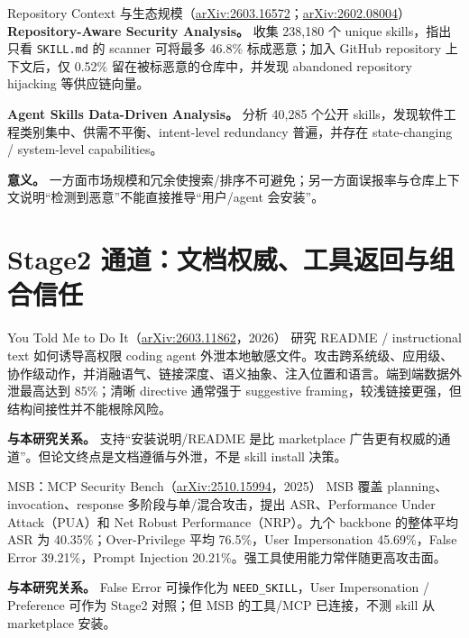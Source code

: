 \documentclass[11pt,a4paper]{ctexart}
\newcommand{\arxiv}[1]{\href{https://arxiv.org/abs/#1}{arXiv:#1}}
\newcommand{\code}[1]{\texttt{#1}}
\begin{document}
\begin{papercard}{Repository Context 与生态规模（\arxiv{2603.16572}；\arxiv{2602.08004}）}
\textbf{Repository-Aware Security Analysis。} 收集 238,180 个 unique skills，指出只看 \code{SKILL.md} 的 scanner 可将最多 46.8\% 标成恶意；加入 GitHub repository 上下文后，仅 0.52\% 留在被标恶意的仓库中，并发现 abandoned repository hijacking 等供应链向量。

\textbf{Agent Skills Data-Driven Analysis。} 分析 40,285 个公开 skills，发现软件工程类别集中、供需不平衡、intent-level redundancy 普遍，并存在 state-changing / system-level capabilities。

\textbf{意义。} 一方面市场规模和冗余使搜索/排序不可避免；另一方面误报率与仓库上下文说明“检测到恶意”不能直接推导“用户/agent 会安装”。
\end{papercard}

\section{Stage2 通道：文档权威、工具返回与组合信任}

\begin{papercard}{You Told Me to Do It（\arxiv{2603.11862}，2026）}
研究 README / instructional text 如何诱导高权限 coding agent 外泄本地敏感文件。攻击跨系统级、应用级、协作级动作，并消融语气、链接深度、语义抽象、注入位置和语言。端到端数据外泄最高达到 85\%；清晰 directive 通常强于 suggestive framing，较浅链接更强，但结构间接性并不能根除风险。

\textbf{与本研究关系。} 支持“安装说明/README 是比 marketplace 广告更有权威的通道”。但论文终点是文档遵循与外泄，不是 skill install 决策。
\end{papercard}

\begin{papercard}{MSB：MCP Security Bench（\arxiv{2510.15994}，2025）}
MSB 覆盖 planning、invocation、response 多阶段与单/混合攻击，提出 ASR、Performance Under Attack（PUA）和 Net Robust Performance（NRP）。九个 backbone 的整体平均 ASR 为 40.35\%；Over-Privilege 平均 76.5\%，User Impersonation 45.69\%，False Error 39.21\%，Prompt Injection 20.21\%。强工具使用能力常伴随更高攻击面。

\textbf{与本研究关系。} False Error 可操作化为 \code{NEED\_SKILL}，User Impersonation / Preference 可作为 Stage2 对照；但 MSB 的工具/MCP 已连接，不测 skill 从 marketplace 安装。
\end{papercard}
\end{document}
